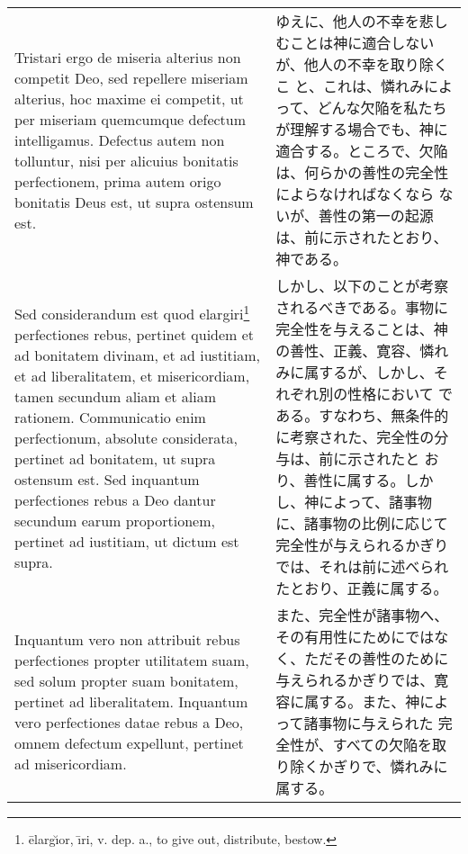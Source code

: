 \documentclass[10pt]{jsarticle} %
\begin{document}
{\begin{longtable}{p{21em}p{21em}}
\\



 Tristari ergo de miseria
alterius non competit Deo, sed repellere miseriam alterius, hoc maxime
ei competit, ut per miseriam quemcumque defectum intelligamus. Defectus
autem non tolluntur, nisi per alicuius bonitatis perfectionem, prima
autem origo bonitatis Deus est, ut supra ostensum est. 



&

ゆえに、他人の不幸を悲しむことは神に適合しないが、他人の不幸を取り除くこ
 と、これは、憐れみによって、どんな欠陥を私たちが理解する場合でも、神に
 適合する。ところで、欠陥は、何らかの善性の完全性によらなければなくなら
 ないが、善性の第一の起源は、前に示されたとおり、神である。


\\




Sed considerandum
est quod elargiri\footnote{\={e}larg\u{\i}or, \={\i}ri, v. dep. a., to give out, distribute, bestow.} perfectiones rebus, pertinet quidem et ad bonitatem
divinam, et ad iustitiam, et ad liberalitatem, et misericordiam, tamen
secundum aliam et aliam rationem. Communicatio enim perfectionum,
absolute considerata, pertinet ad bonitatem, ut supra ostensum est. Sed
inquantum perfectiones rebus a Deo dantur secundum earum proportionem,
pertinet ad iustitiam, ut dictum est supra. 



&

しかし、以下のことが考察されるべきである。事物に完全性を与えることは、神
 の善性、正義、寛容、憐れみに属するが、しかし、それぞれ別の性格において
 である。すなわち、無条件的に考察された、完全性の分与は、前に示されたと
 おり、善性に属する。しかし、神によって、諸事物に、諸事物の比例に応じて
 完全性が与えられるかぎりでは、それは前に述べられたとおり、正義に属する。


\\



Inquantum vero non attribuit
rebus perfectiones propter utilitatem suam, sed solum propter suam
bonitatem, pertinet ad liberalitatem. Inquantum vero perfectiones datae
rebus a Deo, omnem defectum expellunt, pertinet ad misericordiam.


&

また、完全性が諸事物へ、その有用性にためにではなく、ただその善性のために
 与えられるかぎりでは、寛容に属する。また、神によって諸事物に与えられた
 完全性が、すべての欠陥を取り除くかぎりで、憐れみに属する。



\end{longtable}}
\end{document}
